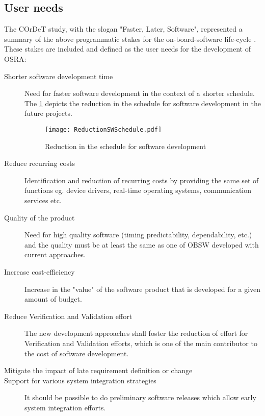 \subsection{User needs}

The COrDeT study, with the slogan "Faster, Later, Software", represented a summary of the above programmatic stakes for the on-board-software life-cycle \cite{CORDET,SAVOIR}. These stakes are included and defined as the user needs \cite{SAVOIR,PhdThesis} for the development of OSRA:

\begin{description}
\item [Shorter software development time] Need for faster software development in the context of a shorter schedule. The \cref{fig:RedSWSched} depicts the reduction in the schedule for software development in the future projects. 

\begin{figure}[h]
	\centering
	\texttt{[image: ReductionSWSchedule.pdf]}
	\caption{Reduction in the schedule for software development}
	\label{fig:RedSWSched}
\end{figure}

\item [Reduce recurring costs] Identification and reduction of recurring costs by providing the same set of functions eg. device drivers, real-time operating systems, communication services etc.   

\item [Quality of the product] Need for high quality software (timing predictability, dependability, etc.) and the quality must be at least the same as one of OBSW developed with current approaches.

\item [Increase cost-efficiency] Increase in the "value" of the software product that is developed for a given amount of budget.

\item [Reduce Verification and Validation effort] The new development approaches shall foster the reduction of effort for Verification and Validation efforts, which is one of the main contributor to the cost of software development.

\item [Mitigate the impact of late requirement definition or change] 

\item [Support for various system integration strategies] It should be possible to do preliminary software releases which allow early system integration efforts.


\end{description}
